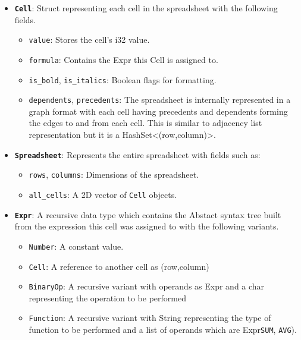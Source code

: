 \documentclass{article}
\begin{document}
\begin{itemize}
    \item \textbf{\texttt{Cell}}:
    Struct representing each cell in the spreadsheet with the following fields.
    \begin{itemize}
        \item \texttt{value}: Stores the cell's i32 value.
        \item \texttt{formula}: Contains the Expr this Cell is assigned to.
        \item \texttt{is\_bold}, \texttt{is\_italics}: Boolean flags for formatting.
        \item \texttt{dependents}, \texttt{precedents}: The spreadsheet is internally represented in a graph format with each cell having precedents and dependents forming the edges to and from each cell. This is similar to adjacency list representation but it is a HashSet<(row,column)>.
        
    \end{itemize}
    \item \textbf{\texttt{Spreadsheet}}:
    Represents the entire spreadsheet with fields such as:
    \begin{itemize}
        \item \texttt{rows}, \texttt{columns}: Dimensions of the spreadsheet.
        \item \texttt{all\_cells}: A 2D vector of \texttt{Cell} objects.
    \end{itemize}
    \item \textbf{\texttt{Expr}}:
A recursive data type which contains the Abstact syntax tree built from the expression this cell was assigned to with the following variants.   \begin{itemize}
        \item \texttt{Number}: A constant value.
        \item \texttt{Cell}: A reference to another cell as (row,column)
        \item \texttt{BinaryOp}: A recursive variant with operands as Expr and a char representing the operation to be performed 
        \item \texttt{Function}: A recursive variant with String representing the type of function to be performed and a list of operands which are Expr\texttt{SUM}, \texttt{AVG}).
    \end{itemize}


\end{itemize}
\end{document}
